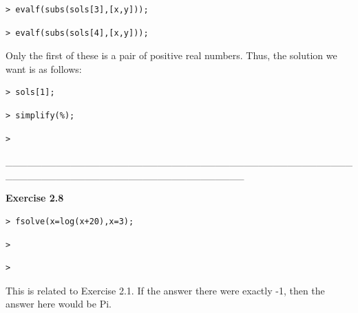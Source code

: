 \documentclass{article}
\begin{document}
\begin{lstlisting}
> evalf(subs(sols[3],[x,y]));
\end{lstlisting}
\begin{lstlisting}
> evalf(subs(sols[4],[x,y]));
\end{lstlisting}
\begin{Maple Normal}
Only the first of these is a pair of positive real numbers.  Thus, the solution we want is as follows:
\end{Maple Normal}
\begin{lstlisting}
> sols[1];
\end{lstlisting}
\begin{lstlisting}
> simplify(%);
\end{lstlisting}
\begin{lstlisting}
> 
\end{lstlisting}
\begin{Maple Normal}
\_\_\_\_\_\_\_\_\_\_\_\_\_\_\_\_\_\_\_\_\_\_\_\_\_\_\_\_\_\_\_\_\_\_\_\_\_\_\_\_\_\_\_\_\_\_\_\_\_\_\_\_\_\_\_\_\_\_\_\_\_\_\_\_\_\_\_\_\_\_\_\_\_\_\_\_\_\_\_\_\_
\end{Maple Normal}
\begin{Maple Heading 2}
\textbf{Exercise 2.8}
\end{Maple Heading 2}
\begin{lstlisting}
> fsolve(x=log(x+20),x=3);
\end{lstlisting}
\begin{lstlisting}
> 
\end{lstlisting}
\begin{lstlisting}
> 
\end{lstlisting}
\begin{Maple Normal}
This is related to Exercise 2.1.  If the answer there were exactly -1, then the answer here would be 
$\mathrm{Pi}$.
\end{Maple Normal}
\begin{Maple Normal}
  
\end{Maple Normal}
\end{document}
